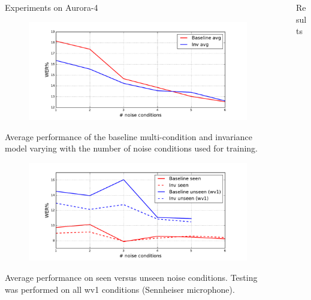 \documentclass[final]{beamer}
\newlength{\sepwid}
\newlength{\onecolwid}
\newlength{\twocolwid}
\begin{document}
\begin{frame}[t]
\begin{columns}[t]
\begin{column}{\twocolwid}
\begin{columns}[t]
\begin{column}{\onecolwid}
\begin{block}{{\Large Experiments on Aurora-4}}
                \begin{figure}
                    \centering
                    \includegraphics[width=\linewidth]{wer_avg.pdf}
                \end{figure}
                Average performance of the baseline multi-condition and invariance model varying with the 
                number of noise conditions used for training. 
                \begin{figure}
                    \centering
                    \includegraphics[width=\linewidth]{wer_seen_unseen.pdf}
                \end{figure}
                Average performance on seen versus 
                unseen noise conditions.
                Testing was performed on all wv1 conditions (Sennheiser microphone).
            \end{block}
        \end{column} %
    \end{columns}
\end{column}

\begin{column}{\sepwid}\end{column} %
\begin{column}{\onecolwid} %
\begin{block}{Results}


\end{block}
\end{column}
\end{columns}
\end{frame}
\end{document}
